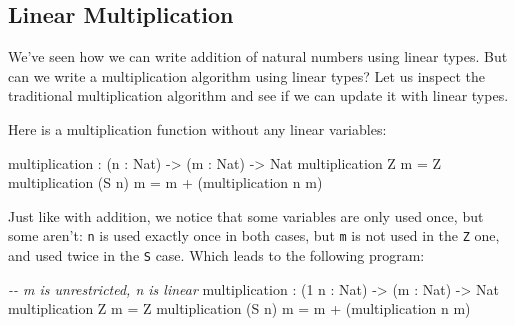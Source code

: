 \documentclass[
]{article}
\newenvironment{Shaded}{}{}
\newcommand{\CommentTok}[1]{\textcolor[rgb]{0.38,0.63,0.69}{\textit{#1}}}
\newcommand{\DataTypeTok}[1]{\textcolor[rgb]{0.56,0.13,0.00}{#1}}
\newcommand{\DecValTok}[1]{\textcolor[rgb]{0.25,0.63,0.44}{#1}}
\newcommand{\NormalTok}[1]{#1}
\newcommand{\OperatorTok}[1]{\textcolor[rgb]{0.40,0.40,0.40}{#1}}
\newcommand{\OtherTok}[1]{\textcolor[rgb]{0.00,0.44,0.13}{#1}}
\begin{document}
\hypertarget{linear-multiplication}{%
\subsection{Linear Multiplication}\label{linear-multiplication}}

We've seen how we can write addition of natural numbers using linear
types. But can we write a multiplication algorithm using linear types?
Let us inspect the traditional multiplication algorithm and see if we
can update it with linear types.

Here is a multiplication function without any linear variables:

\begin{Shaded}
\begin{Highlighting}[]
\NormalTok{multiplication }\OperatorTok{:}\NormalTok{ (n }\OperatorTok{:} \DataTypeTok{Nat}\NormalTok{) }\OtherTok{{-}\textgreater{}}\NormalTok{ (m }\OperatorTok{:} \DataTypeTok{Nat}\NormalTok{) }\OtherTok{{-}\textgreater{}} \DataTypeTok{Nat}
\NormalTok{multiplication }\DataTypeTok{Z}\NormalTok{ m }\OtherTok{=} \DataTypeTok{Z} 
\NormalTok{multiplication (}\DataTypeTok{S}\NormalTok{ n) m }\OtherTok{=}\NormalTok{ m }\OperatorTok{+}\NormalTok{ (multiplication n m)}
\end{Highlighting}
\end{Shaded}

Just like with addition, we notice that some variables are only used
once, but some aren't: \texttt{n} is used exactly once in both cases,
but \texttt{m} is not used in the \texttt{Z} one, and used twice in the
\texttt{S} case. Which leads to the following program:

\begin{Shaded}
\begin{Highlighting}[]
\CommentTok{{-}{-} \textasciigrave{}m\textasciigrave{} is unrestricted, \textasciigrave{}n\textasciigrave{} is linear}
\NormalTok{multiplication }\OperatorTok{:}\NormalTok{ (}\DecValTok{1}\NormalTok{ n }\OperatorTok{:} \DataTypeTok{Nat}\NormalTok{) }\OtherTok{{-}\textgreater{}}\NormalTok{ (m }\OperatorTok{:} \DataTypeTok{Nat}\NormalTok{) }\OtherTok{{-}\textgreater{}} \DataTypeTok{Nat}
\NormalTok{multiplication }\DataTypeTok{Z}\NormalTok{ m }\OtherTok{=} \DataTypeTok{Z}
\NormalTok{multiplication (}\DataTypeTok{S}\NormalTok{ n) m }\OtherTok{=}\NormalTok{ m }\OperatorTok{+}\NormalTok{ (multiplication n m)}
\end{Highlighting}
\end{Shaded}
\end{document}

